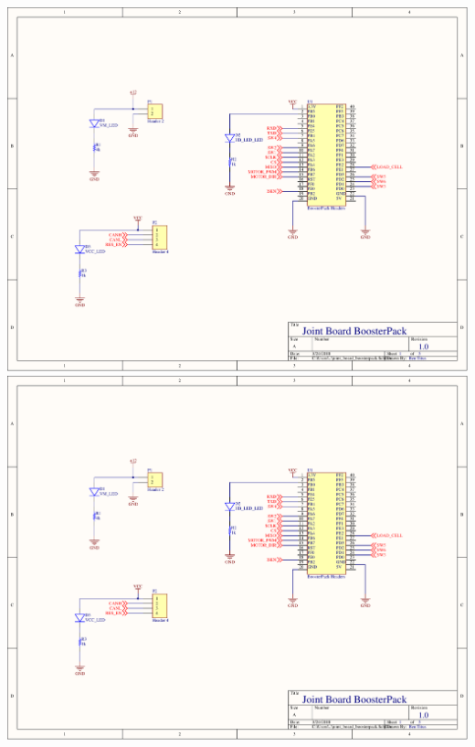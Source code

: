 \includegraphics[page=6,width=\textwidth,angle=270]{PDFs/joint_board_boosterpack.PDF} \newpage
\includegraphics[page=7,width=\textwidth,angle=270]{PDFs/joint_board_boosterpack.PDF} \newpage